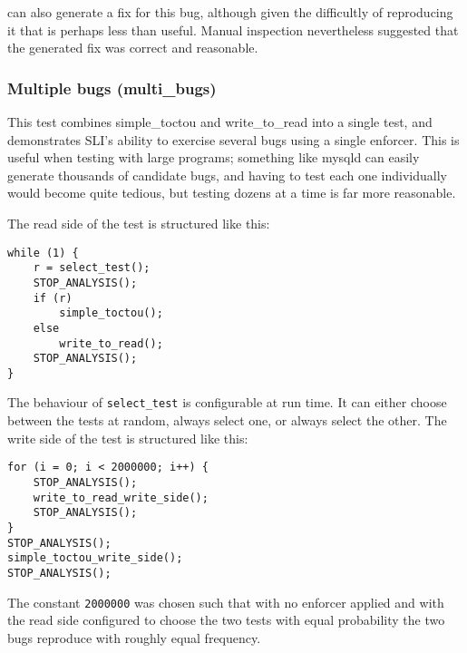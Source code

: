 {\Technique} can also generate a fix for this bug, although given the
difficultly of reproducing it that is perhaps less than useful.
Manual inspection nevertheless suggested that the generated fix was
correct and reasonable.


\subsubsection{Multiple bugs (multi\_bugs)}

This test combines simple\_toctou and write\_to\_read into a single
test, and demonstrates SLI's ability to exercise several bugs using a
single enforcer.  This is useful when testing with large programs;
something like mysqld can easily generate thousands of candidate bugs,
and having to test each one individually would become quite tedious,
but testing dozens at a time is far more reasonable.

The read side of the test is structured like this:

\begin{verbatim}
while (1) {
    r = select_test();
    STOP_ANALYSIS();
    if (r)
        simple_toctou();
    else
        write_to_read();
    STOP_ANALYSIS();
}
\end{verbatim}

The behaviour of \verb|select_test| is configurable at run time.  It
can either choose between the tests at random, always select one, or
always select the other.  The write side of the test is structured
like this:

\begin{verbatim}
for (i = 0; i < 2000000; i++) {
    STOP_ANALYSIS();
    write_to_read_write_side();
    STOP_ANALYSIS();
}
STOP_ANALYSIS();
simple_toctou_write_side();
STOP_ANALYSIS();
\end{verbatim}

The constant \verb|2000000| was chosen such that with no enforcer
applied and with the read side configured to choose the two tests with
equal probability the two bugs reproduce with roughly equal frequency.

